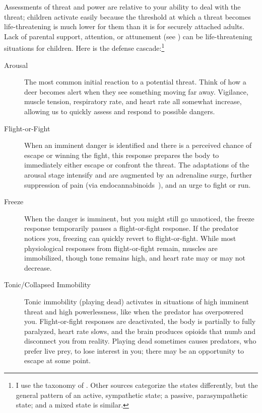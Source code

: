 \documentclass[11pt,oneside]{book}
\let\cite\parencite
\begin{document}
Assessments of threat and power are relative to your ability to deal with the threat; children activate easily because the threshold at which a threat becomes life-threatening is much lower for them than it is for securely attached adults. Lack of parental support, attention, or attunement (see \textcite{fivePillars}) can be life-threatening situations for children. Here is the defense cascade:\footnote{I use the taxonomy of \textcite{kozlowskaDefenseCascade}. Other sources categorize the states differently, but the general pattern of an active, sympathetic state; a passive, parasympathetic state; and a mixed state is similar.}
\begin{description}
    \item[Arousal] The most common initial reaction to a potential threat. Think of how a deer becomes alert when they see something moving far away. Vigilance, muscle tension, respiratory rate, and heart rate all somewhat increase, allowing us to quickly assess and respond to possible dangers.
    \item[Flight-or-Fight\footnotemark] 
    When an imminent danger is identified and there is a perceived chance of escape or winning the fight, this response prepares the body to immediately either escape or confront the threat. The adaptations of the arousal stage intensify and are augmented by an adrenaline surge, further suppression of pain (via endocannabinoids~\cite{lanius2018review}), and an urge to fight or run.
    \item[Freeze] When the danger is imminent, but you might still go unnoticed, the freeze response temporarily pauses a flight-or-fight response. If the predator notices you, freezing can quickly revert to flight-or-fight. While most physiological responses from flight-or-fight remain, muscles are immobilized, though tone remains high, and heart rate may or may not decrease.
    \item[Tonic/Collapsed Immobility] Tonic immobility (playing dead) activates in situations of high imminent threat and high powerlessness, like when the predator has overpowered you. Flight-or-fight responses are deactivated, the body is partially to fully paralyzed, heart rate slows, and the brain produces opioids that numb and disconnect you from reality. Playing dead sometimes causes predators, who prefer live prey, to lose interest in you; there may be an opportunity to escape at some point.
    

\end{description}
\end{document}
